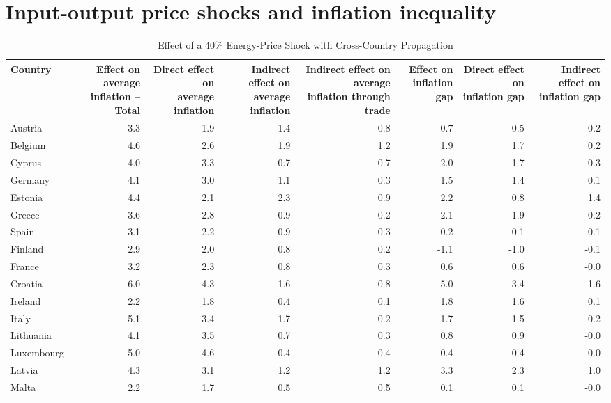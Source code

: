 \documentclass[11pt]{article}
\begin{document}
\section*{Input-output price shocks and inflation inequality}
\begin{table}[H]
\centering
\caption{Effect of a 40\% Energy-Price Shock with Cross-Country Propagation}
\scriptsize
\setlength{\tabcolsep}{1.2pt}
\begin{tabular}{lrrrrrrr}
\toprule
Country & \shortstack{Effect on average\\inflation -- Total} & \shortstack{Direct effect on\\average inflation} & \shortstack{Indirect effect on\\average inflation} & \shortstack{Indirect effect on average\\inflation through trade} & \shortstack{Effect on\\inflation gap} & \shortstack{Direct effect on\\inflation gap} & \shortstack{Indirect effect on\\inflation gap}
 \\
\midrule
Austria & 3.3 & 1.9 & 1.4 & 0.8 & 0.7 & 0.5 & 0.2
 \\
Belgium & 4.6 & 2.6 & 1.9 & 1.2 & 1.9 & 1.7 & 0.2
 \\
Cyprus & 4.0 & 3.3 & 0.7 & 0.7 & 2.0 & 1.7 & 0.3
 \\
Germany & 4.1 & 3.0 & 1.1 & 0.3 & 1.5 & 1.4 & 0.1
 \\
Estonia & 4.4 & 2.1 & 2.3 & 0.9 & 2.2 & 0.8 & 1.4
 \\
Greece & 3.6 & 2.8 & 0.9 & 0.2 & 2.1 & 1.9 & 0.2
 \\
Spain & 3.1 & 2.2 & 0.9 & 0.3 & 0.2 & 0.1 & 0.1
 \\
Finland & 2.9 & 2.0 & 0.8 & 0.2 & -1.1 & -1.0 & -0.1
 \\
France & 3.2 & 2.3 & 0.8 & 0.3 & 0.6 & 0.6 & -0.0
 \\
Croatia & 6.0 & 4.3 & 1.6 & 0.8 & 5.0 & 3.4 & 1.6
 \\
Ireland & 2.2 & 1.8 & 0.4 & 0.1 & 1.8 & 1.6 & 0.1
 \\
Italy & 5.1 & 3.4 & 1.7 & 0.2 & 1.7 & 1.5 & 0.2
 \\
Lithuania & 4.1 & 3.5 & 0.7 & 0.3 & 0.8 & 0.9 & -0.0
 \\
Luxembourg & 5.0 & 4.6 & 0.4 & 0.4 & 0.4 & 0.4 & 0.0
 \\
Latvia & 4.3 & 3.1 & 1.2 & 1.2 & 3.3 & 2.3 & 1.0
 \\
Malta & 2.2 & 1.7 & 0.5 & 0.5 & 0.1 & 0.1 & -0.0

\end{tabular}
\end{table}
\end{document}

